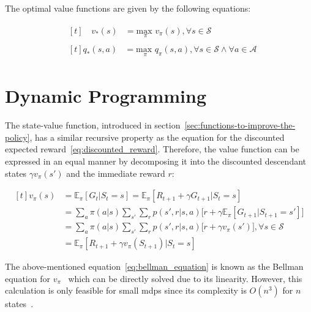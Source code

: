 \documentclass[draft,final]{vutinfth} %
\newcommand{\p}[1]{see p. #1}
\begin{document}
    The optimal value functions are given by the following equations:

    \begin{align}
        &\begin{aligned}[t]
             \phantom{,a}v_*(s) &= \underset{\pi}{\text{max }}v_\pi(s), \forall s \in \mathcal{S}\label{eq:optimal1}
        \end{aligned}\\
        &\begin{aligned}[t]
             q_*(s,a) &= \underset{\pi}{\text{max }}q_\pi(s,a), \forall s \in \mathcal{S} \land \forall a \in \mathcal{A}\label{eq:optimal2}
        \end{aligned}
    \end{align}


    \section{Dynamic Programming}

    The state-value function, introduced in section~\ref{sec:functions-to-improve-the-policy}, has a similar recursive property as the equation for the discounted expected reward~\eqref{eq:discounted_reward}.
    Therefore, the value function can be expressed in an equal manner by decomposing it into the discounted descendant states $\gamma v_\pi(s')$ and the immediate reward $r$:

    \begin{equation}
        \begin{aligned}[t]
            v_\pi(s) &= \mathbb{E}_\pi[G_t|S_t=s] = \mathbb{E}_\pi[R_{t+1} + \gamma G_{t+1}|S_t=s] \\
            &  =  \sum_{a} \pi(a|s) \sum_{s'}\sum_{r} p(s',r|s,a) \bigg[r + \gamma \mathbb{E}_\pi[G_{t+1}|S_{t+1} = s'] \bigg] \\
            &  =  \sum_{a} \pi(a|s) \sum_{s'}\sum_{r} p(s',r|s,a) \bigg[r + \gamma v_{\pi}(s') \bigg], \forall s \in \mathcal{S} \\
            &  =  \mathbb{E}_\pi[R_{t+1} + \gamma v_\pi(S_{t+1})|S_t=s]
            \label{eq:bellman_equation}
        \end{aligned}
    \end{equation}

    The above-mentioned equation~\eqref{eq:bellman_equation} is known as the Bellman equation for $v_\pi$~\citep[\p{59}]{sutton_reinforcement_2018} which can be directly solved due to its linearity.
    However, this calculation is only feasible for small \glspl{mdp} since its complexity is $O(n^3)$ for $n$ states~.
\end{document}
